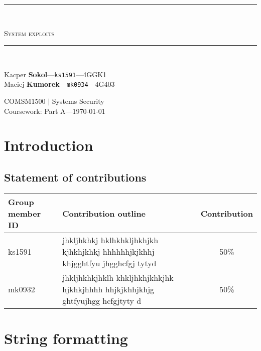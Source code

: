 \documentclass[12pt, a4paper, pdflatex]{article}
\newcommand{\HRule}{\rule{\linewidth}{0.5mm}}
\begin{document}

\begin{center}
    \begin{large}
    {\HRule \\[0.2cm]}
    \textsc{System exploits}
    {\HRule \\[0.3cm]}
    \end{large}

    \begin{minipage}{ 0.49\textwidth }
        \begin{flushleft}
            Kacper \textbf{Sokol}---\texttt{ks1591}---4GGK1\\
            Maciej \textbf{Kumorek}---\texttt{mk0934}---4G403\\
        \end{flushleft}
    \end{minipage}
    \begin{minipage}{ 0.49\textwidth }
        \begin{flushright}
            {COMSM1500 $|$ Systems Security\\
            Coursework: Part A---\today\\[0.3cm]}
        \end{flushright}
    \end{minipage}
\end{center}

\section{Introduction}

\subsection{Statement of contributions}

\begin{center}
\begin{tabular}{ l | p{8.5cm} | c }
  Group member ID & Contribution outline & Contribution \\
  \hline
  ks1591 & jhkljhkhkj hklhkhkljhkhjkh kjhkhjkhkj hhhhhhjkjkhhj khjgghtfyu jhgghcfgj tytyd & 50\% \\
  mk0932 & jhkljhkhkjhklh  khkljhkhjkhkjhk hjkhkjhhhh hhjkjkhhjkhjg ghtfyujhgg hcfgjtyty d & 50\% \\
\end{tabular}
\end{center}

\section{String formatting}
\end{document}
